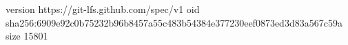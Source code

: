 version https://git-lfs.github.com/spec/v1
oid sha256:6909e92c0b75232b96b8457a55c483b54384e377230eef0873ed3d83a567c59a
size 15801
